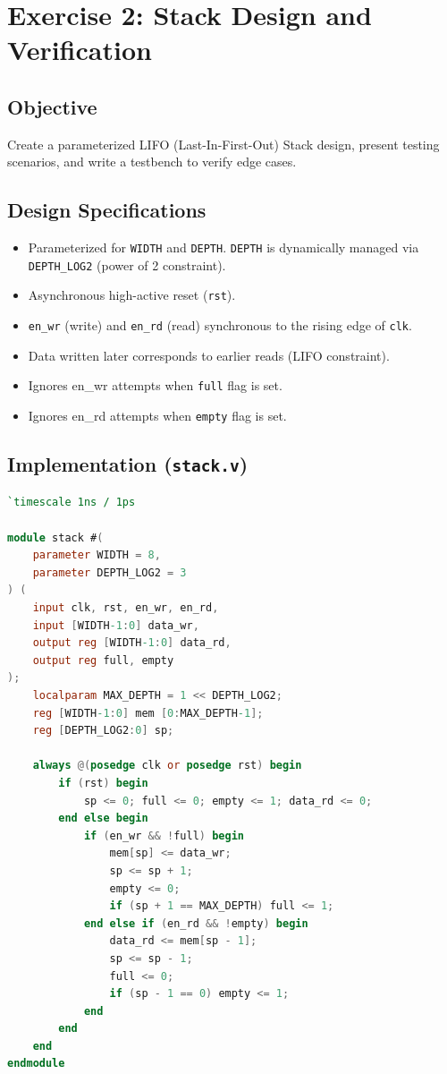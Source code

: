 \documentclass[12pt,a4paper]{article}
\begin{document}
\section{Exercise 2: Stack Design and Verification}

\subsection{Objective}
Create a parameterized LIFO (Last-In-First-Out) Stack design, present testing scenarios, and write a testbench to verify edge cases.

\subsection{Design Specifications}
\begin{itemize}
    \item Parameterized for \texttt{WIDTH} and \texttt{DEPTH}. \texttt{DEPTH} is dynamically managed via \texttt{DEPTH\_LOG2} (power of 2 constraint).
    \item Asynchronous high-active reset (\texttt{rst}).
    \item \texttt{en\_wr} (write) and \texttt{en\_rd} (read) synchronous to the rising edge of \texttt{clk}.
    \item Data written later corresponds to earlier reads (LIFO constraint).
    \item Ignores en\_wr attempts when \texttt{full} flag is set.
    \item Ignores en\_rd attempts when \texttt{empty} flag is set.
\end{itemize}

\subsection{Implementation (\texttt{stack.v})}
\begin{lstlisting}[language=Verilog]
`timescale 1ns / 1ps

module stack #(
    parameter WIDTH = 8,
    parameter DEPTH_LOG2 = 3
) (
    input clk, rst, en_wr, en_rd,
    input [WIDTH-1:0] data_wr,
    output reg [WIDTH-1:0] data_rd,
    output reg full, empty
);
    localparam MAX_DEPTH = 1 << DEPTH_LOG2;
    reg [WIDTH-1:0] mem [0:MAX_DEPTH-1];
    reg [DEPTH_LOG2:0] sp;

    always @(posedge clk or posedge rst) begin
        if (rst) begin
            sp <= 0; full <= 0; empty <= 1; data_rd <= 0;
        end else begin
            if (en_wr && !full) begin
                mem[sp] <= data_wr;
                sp <= sp + 1;
                empty <= 0;
                if (sp + 1 == MAX_DEPTH) full <= 1;
            end else if (en_rd && !empty) begin
                data_rd <= mem[sp - 1];
                sp <= sp - 1;
                full <= 0;
                if (sp - 1 == 0) empty <= 1;
            end
        end
    end
endmodule
\end{lstlisting}
\end{document}
